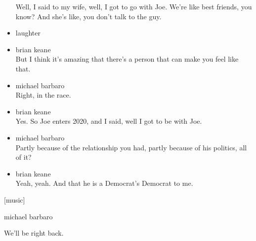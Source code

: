 \begin{itemize}
  Well, I said to my wife, well, I got to go with Joe. We're like best
  friends, you know? And she's like, you don't talk to the guy.
\item
  laughter
\item
  brian keane\\
  But I think it's amazing that there's a person that can make you feel
  like that.
\item
  michael barbaro\\
  Right, in the race.
\item
  brian keane\\
  Yes. So Joe enters 2020, and I said, well I got to be with Joe.
\item
  michael barbaro\\
  Partly because of the relationship you had, partly because of his
  politics, all of it?
\item
  brian keane\\
  Yeah, yeah. And that he is a Democrat's Democrat to me.
\end{itemize}

{[}music{]}

michael barbaro

We'll be right back.

